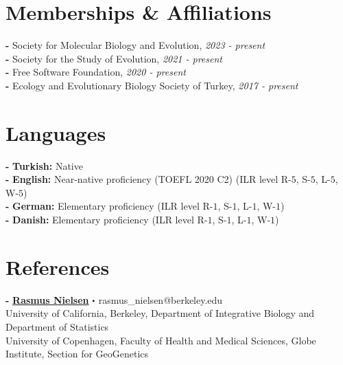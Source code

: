 \documentclass[letterpaper,10.5pt]{article}
\newcommand\sbullet[1][.5]{\mathbin{\vcenter{\hbox{\scalebox{#1}{$\bullet$}}}}}
\begin{document}
\section{Memberships \& Affiliations}
\textbf{-} Society for Molecular Biology and Evolution, \textit{2023 - present} \\
\textbf{-} Society for the Study of Evolution, \textit{2021 - present} \\
\textbf{-} Free Software Foundation, \textit{2020 - present} \\
\textbf{-} Ecology and Evolutionary Biology Society of Turkey, \textit{2017 - present} \\

 

\section{Languages}
    \textbf{-}  \textbf{Turkish:} Native \\
    \textbf{-}  \textbf{English:} Near-native proficiency (TOEFL 2020 C2) (ILR level R-$5$, S-$5$, L-$5$, W-$5$) \\
    \textbf{-}  \textbf{German:} Elementary proficiency (ILR level R-$1$, S-$1$, L-$1$, W-$1$) \\
    \textbf{-}  \textbf{Danish:} Elementary proficiency (ILR level R-$1$, S-$1$, L-$1$, W-$1$) \\

\section{References}

\textbf{-} \textbf{\href{https://scholar.google.com/citations?user=PySbfcEAAAAJ&hl=en&oi=ao}{Rasmus Nielsen}}  $\sbullet[.5]$ rasmus\_nielsen@berkeley.edu \\
University of California, Berkeley, Department of Integrative Biology and Department of Statistics \\
University of Copenhagen, Faculty of Health and Medical Sciences, Globe Institute, Section for GeoGenetics \\
\end{document}
